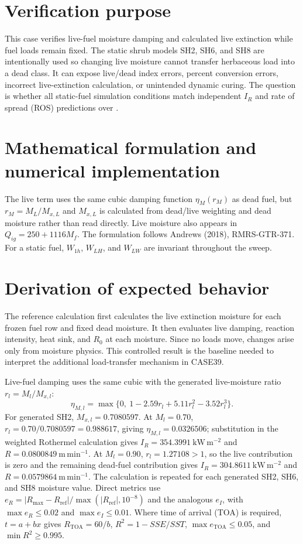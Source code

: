 \section{Verification purpose}

This case verifies live-fuel moisture damping and calculated live extinction while fuel loads remain fixed.  The static shrub models SH2, SH6, and SH8 are intentionally used so changing live moisture cannot transfer herbaceous load into a dead class.  It can expose live/dead index errors, percent conversion errors, incorrect live-extinction calculation, or unintended dynamic curing.  The question is whether all static-fuel simulation conditions match independent $I_R$ and rate of spread (ROS) predictions over \LiveMoistureSet{}.

\section{Mathematical formulation and numerical implementation}
The live term uses the same cubic damping function $\eta_M(r_M)$ as dead fuel, but $r_M=M_L/M_{x,L}$ and $M_{x,L}$ is calculated from dead/live weighting and dead moisture rather than read directly.  Live moisture also appears in $Q_{ig}=250+1116M_f$.  The formulation follows Andrews (2018), RMRS-GTR-371.  For a static fuel, $W_{1h}$, $W_{LH}$, and $W_{LW}$ are invariant throughout the sweep.

\section{Derivation of expected behavior}
The reference calculation first calculates the live extinction moisture for each frozen fuel row and fixed dead moisture.  It then evaluates live damping, reaction intensity, heat sink, and $R_0$ at each moisture.  Since no loads move, changes arise only from moisture physics.  This controlled result is the baseline needed to interpret the additional load-transfer mechanism in CASE39.

Live-fuel damping uses the same cubic with the generated live-moisture
ratio \(r_l=M_l/M_{x,l}\):
\[
 \eta_{M,l}=\max\{0,\ 1-2.59r_l+5.11r_l^2-3.52r_l^3\}.
\]
For generated SH2, \(M_{x,l}=0.7080597\).  At \(M_l=0.70\),
\(r_l=0.70/0.7080597=0.988617\), giving
\(\eta_{M,l}=0.0326506\); substitution in the weighted Rothermel
calculation gives \(I_R=354.3991~\mathrm{kW\,m^{-2}}\) and
\(R=0.0800849~\mathrm{m\,min^{-1}}\).  At \(M_l=0.90\),
\(r_l=1.27108>1\), so the live contribution is zero and the remaining
dead-fuel contribution gives \(I_R=304.8611~\mathrm{kW\,m^{-2}}\) and
\(R=0.0579864~\mathrm{m\,min^{-1}}\).
The calculation is repeated for each generated SH2, SH6, and SH8 moisture
value.  Direct metrics use
\(e_R=|R_{\max}-R_{\mathrm{ref}}|/
\max(|R_{\mathrm{ref}}|,10^{-8})\) and the analogous \(e_I\), with
\(\max e_R\leq0.02\) and \(\max e_I\leq0.01\).
Where time of arrival (TOA) is required, \(t=a+bx\) gives
\(R_{\mathrm{TOA}}=60/b\), \(R^2=1-SSE/SST\),
\(\max e_{\mathrm{TOA}}\leq0.05\), and \(\min R^2\geq0.995\).

